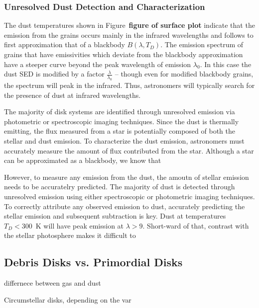            
        \subsubsection{Unresolved Dust Detection and Characterization}            
            
        The dust temperatures shown in Figure~\textbf{figure of surface plot} indicate that the emission from the grains occurs mainly in the infrared wavelengths and follows to first approximation that of a blackbody $B(\lambda,T_D)$. The emission spectrum of grains that have emissivities which deviate from the blackbody approximation have a steeper curve beyond the peak wavelength of emission $\lambda_0$. In this case the dust SED is modified by a factor $\frac{\lambda}{\lambda_0}$ -- though even for modified blackbody grains, the spectrum will peak in the infrared. Thus, astronomers will typically search for the presence of dust at infrared wavelengths. 
        
        The majority of disk systems are identified through unresolved emission via photometric or spectroscopic imaging techniques. Since the dust is thermally emitting, the flux measured from a star is potentially composed of both the stellar and dust emission. To characterize the dust emission, astronomers must accurately measure the amount of flux contributed from the star. Although a star can be approximated as a blackbody, we know that 
        
        
        However, to measure any emission from the dust, the amoutn of stellar emission needs to be accuratelry predicted. The majority of dust is detected through unresolved emission using either spectroscopic or photometric imaging techniques. To correctly attribute any observed emission to dust, accurately predicting the stellar emission and subsequent subtraction is key.  Dust at temperatures $T_D<300$~K will have peak emission at $\lambda>9$\micron. Short-ward of that, contrast with the stellar photosphere makes it difficult to 
            
            
            
    \subsection{Debris Disks vs. Primordial Disks}        
        
        differnece between gas and dust
        
        Circumstellar disks, depending on the var
        
